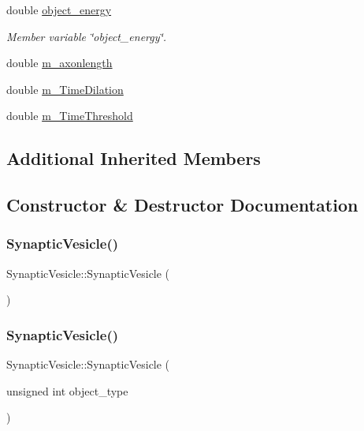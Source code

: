 \begin{DoxyCompactItemize}
double \mbox{\hyperlink{classSynapticVesicle_ad97b48b851a719a0dc2cda6d4c5e3d1b}{object\+\_\+energy}}
\begin{DoxyCompactList}\small\item\em Member variable \char`\"{}object\+\_\+energy\char`\"{}. \end{DoxyCompactList}\item 
double \mbox{\hyperlink{classSynapticVesicle_aafcd5ff5201db3b6d6af126361302607}{m\+\_\+axonlength}}
\item 
double \mbox{\hyperlink{classSynapticVesicle_abedd5d5b6ab7783fc98967c39fbb8acc}{m\+\_\+\+Time\+Dilation}}
\item 
double \mbox{\hyperlink{classSynapticVesicle_a98b593024ea14db5ab7ab5e899c5a733}{m\+\_\+\+Time\+Threshold}}
\end{DoxyCompactItemize}
\subsection*{Additional Inherited Members}


\subsection{Constructor \& Destructor Documentation}
\mbox{\label{classSynapticVesicle_ac3f899ed25281a6d337ecefe1da41c67}} 
\subsubsection{\texorpdfstring{Synaptic\+Vesicle()}{SynapticVesicle()}\hspace{0.1cm}{\footnotesize\ttfamily [1/4]}}
{\footnotesize\ttfamily Synaptic\+Vesicle\+::\+Synaptic\+Vesicle (\begin{DoxyParamCaption}{ }\end{DoxyParamCaption})\hspace{0.3cm}{\ttfamily [inline]}}

\mbox{\label{classSynapticVesicle_aefd8a743e80077235a1c9a9fd133cc9d}} 
\subsubsection{\texorpdfstring{Synaptic\+Vesicle()}{SynapticVesicle()}\hspace{0.1cm}{\footnotesize\ttfamily [2/4]}}
{\footnotesize\ttfamily Synaptic\+Vesicle\+::\+Synaptic\+Vesicle (\begin{DoxyParamCaption}\item[{unsigned int}]{object\+\_\+type }\end{DoxyParamCaption})\hspace{0.3cm}{\ttfamily [inline]}}

